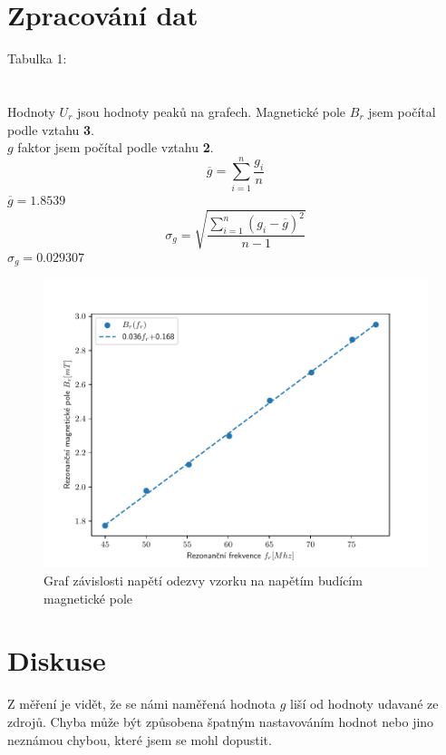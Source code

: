 \documentclass{article}
\begin{document}
\section{Zpracování dat}
\footnotesize{Tabulka 1:}\\
\large{
\\
}
\vspace{1em}
\\
Hodnoty $U_{r}$ jsou hodnoty peaků na grafech. Magnetické pole $B_{r}$ jsem počítal podle vztahu \textbf{3}.\\
$g$ faktor jsem počítal podle vztahu \textbf{2}.
$$\overline{g} = \sum^{n}_{i=1}\frac{g_{i}}{n}$$
$\overline{g} = 1.8539$\\

$$\sigma_{g} = \sqrt{\frac{\sum^{n}_{i=1}(g_{i} - \overline{g})^{2}}{n-1}}$$
$\sigma_{g} = 0.029307$
\\
\vspace{1em}
\begin{figure}[H]
  \hspace*{-8em}
  \includegraphics[scale=1]{figs/resd.pdf}
  \caption{Graf závislosti napětí odezvy vzorku na napětím budícím magnetické pole}
\end{figure}
\clearpage
\section{Diskuse}
Z měření je vidět, že se námi naměřená hodnota $g$ liší od hodnoty udavané ze zdrojů. Chyba může být způsobena špatným nastavováním hodnot nebo jino neznámou chybou, které jsem se mohl dopustit.
\end{document}
